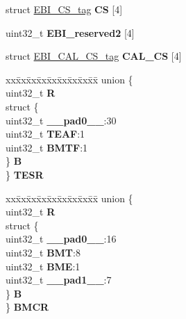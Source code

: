 \begin{DoxyCompactItemize}
\begin{tabbing}
\end{tabbing}\item 
\mbox{\label{structEBI__tag_a48851613d41e1e8880f680aefcefdae1}} 
struct \mbox{\hyperlink{structEBI__CS__tag}{E\+B\+I\+\_\+\+C\+S\+\_\+tag}} {\bfseries CS} \mbox{[}4\mbox{]}
\item 
\mbox{\label{structEBI__tag_a50df58563eda2243c90407033f57e1dc}} 
uint32\+\_\+t {\bfseries E\+B\+I\+\_\+reserved2} \mbox{[}4\mbox{]}
\item 
\mbox{\label{structEBI__tag_ae2a1330d38fa7796362cd5e4af678207}} 
struct \mbox{\hyperlink{structEBI__CAL__CS__tag}{E\+B\+I\+\_\+\+C\+A\+L\+\_\+\+C\+S\+\_\+tag}} {\bfseries C\+A\+L\+\_\+\+CS} \mbox{[}4\mbox{]}
\item 
\mbox{\label{structEBI__tag_a2efe66d01614efb32e69eceed85009ef}} 
\begin{tabbing}
xx\=xx\=xx\=xx\=xx\=xx\=xx\=xx\=xx\=\kill
union \{\\
\>uint32\_t {\bfseries R}\\
\>struct \{\\
\>\>uint32\_t {\bfseries \_\_pad0\_\_}:30\\
\>\>uint32\_t {\bfseries TEAF}:1\\
\>\>uint32\_t {\bfseries BMTF}:1\\
\>\} {\bfseries B}\\
\} {\bfseries TESR}\\

\end{tabbing}\item 
\mbox{\label{structEBI__tag_a61b2c069ef3e291e2ae067cd230f0610}} 
\begin{tabbing}
xx\=xx\=xx\=xx\=xx\=xx\=xx\=xx\=xx\=\kill
union \{\\
\>uint32\_t {\bfseries R}\\
\>struct \{\\
\>\>uint32\_t {\bfseries \_\_pad0\_\_}:16\\
\>\>uint32\_t {\bfseries BMT}:8\\
\>\>uint32\_t {\bfseries BME}:1\\
\>\>uint32\_t {\bfseries \_\_pad1\_\_}:7\\
\>\} {\bfseries B}\\
\} {\bfseries BMCR}\\


\end{tabbing}
\end{DoxyCompactItemize}
